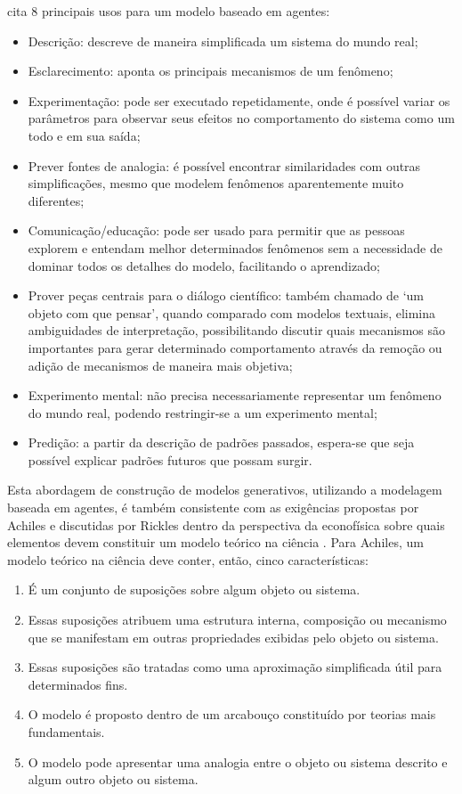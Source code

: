 \cite{10.2307/j.ctt17kk851} cita 8 principais usos para um modelo baseado em agentes:
\begin{itemize}
    \item Descrição: descreve de maneira simplificada um sistema do mundo real;
    \item Esclarecimento: aponta os principais mecanismos de um fenômeno;
    \item Experimentação: pode ser executado repetidamente, onde é possível variar os parâmetros para observar seus efeitos no comportamento do sistema como um todo e em sua saída;
    \item Prever fontes de analogia: é possível encontrar similaridades com outras simplificações, mesmo que modelem fenômenos aparentemente muito diferentes;
    \item  Comunicação/educação: pode ser usado para permitir que as pessoas explorem e entendam melhor determinados fenômenos sem a necessidade de dominar todos os detalhes do modelo, facilitando o aprendizado;
    \item Prover peças centrais para o diálogo científico: também chamado de `um objeto com que pensar', quando comparado com modelos textuais, elimina ambiguidades de interpretação, possibilitando discutir quais mecanismos são importantes para gerar determinado comportamento através da remoção ou adição de mecanismos de maneira mais objetiva;
    \item Experimento mental: não precisa necessariamente representar um fenômeno do mundo real, podendo restringir-se a um experimento mental;
    \item Predição: a partir da descrição de padrões passados, espera-se que seja possível explicar padrões futuros que possam surgir. 
\end{itemize}

Esta abordagem de construção de modelos generativos, utilizando a modelagem baseada em agentes, é também consistente com as exigências propostas por Achiles e discutidas por Rickles dentro da perspectiva da econofísica sobre quais elementos devem constituir um modelo teórico na ciência \cite{RICKLES2007948}. Para Achiles, um modelo teórico na ciência deve conter, então, cinco características:

\begin{enumerate}
    \item É um conjunto de suposições sobre algum objeto ou sistema.
    \item Essas suposições atribuem uma estrutura interna, composição ou mecanismo que se manifestam em outras propriedades exibidas pelo objeto ou sistema.
    \item Essas suposições são tratadas como uma aproximação simplificada útil para determinados fins.
    \item O modelo é proposto dentro de um arcabouço constituído por teorias mais fundamentais.
    \item O modelo pode apresentar uma analogia entre o objeto ou sistema descrito e algum outro objeto ou sistema.
\end{enumerate}

